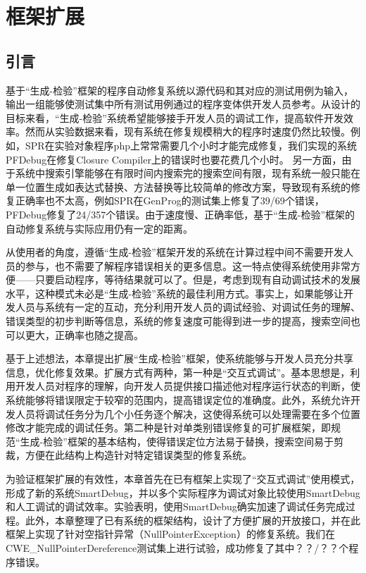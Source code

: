 \chapter{框架扩展}
\label{cha:ext}

\section{引言}%
基于“生成-检验”框架的程序自动修复系统以源代码和其对应的测试用例为输入，输出一组能够使测试集中所有测试用例通过的程序变体供开发人员参考。从设计的目标来看，“生成-检验”系统希望能够接手开发人员的调试工作，提高软件开发效率。然而从实验数据来看，现有系统在修复规模稍大的程序时速度仍然比较慢。例如，SPR在实验对象程序php上常常需要几个小时才能完成修复，我们实现的系统PFDebug在修复Closure Compiler上的错误时也要花费几个小时。
另一方面，由于系统中搜索引擎能够在有限时间内搜索完的搜索空间有限，现有系统一般只能在单一位置生成如表达式替换、方法替换等比较简单的修改方案，导致现有系统的修复正确率也不太高，例如SPR在GenProg的测试集上修复了39/69个错误，PFDebug修复了24/357个错误。由于速度慢、正确率低，基于“生成-检验”框架的自动修复系统与实际应用仍有一定的距离。

从使用者的角度，遵循“生成-检验”框架开发的系统在计算过程中间不需要开发人员的参与，也不需要了解程序错误相关的更多信息。这一特点使得系统使用非常方便——只要启动程序，等待结果就可以了。但是，考虑到现有自动调试技术的发展水平，这种模式未必是“生成-检验”系统的最佳利用方式。事实上，如果能够让开发人员与系统有一定的互动，充分利用开发人员的调试经验、对调试任务的理解、错误类型的初步判断等信息，系统的修复速度可能得到进一步的提高，搜索空间也可以更大，正确率也随之提高。

基于上述想法，本章提出扩展“生成-检验”框架，使系统能够与开发人员充分共享信息，优化修复效果。扩展方式有两种，第一种是“交互式调试”。基本思想是，利用开发人员对程序的理解，向开发人员提供接口描述他对程序运行状态的判断，使系统能够将错误限定于较窄的范围内，提高错误定位的准确度。此外，系统允许开发人员将调试任务分为几个小任务逐个解决，这使得系统可以处理需要在多个位置修改才能完成的调试任务。第二种是针对单类别错误修复的可扩展框架，即规范“生成-检验”框架的基本结构，使得错误定位方法易于替换，搜索空间易于剪裁，方便在此结构上构造针对特定错误类型的修复系统。

为验证框架扩展的有效性，本章首先在已有框架上实现了“交互式调试”使用模式，形成了新的系统SmartDebug，并以多个实际程序为调试对象比较使用SmartDebug和人工调试的调试效率。实验表明，使用SmartDebug确实加速了调试任务完成过程。此外，本章整理了已有系统的框架结构，设计了方便扩展的开放接口，并在此框架上实现了针对空指针异常（NullPointerException）的修复系统。我们在CWE\_NullPointerDereference测试集上进行试验，成功修复了其中？？/？？个程序错误。

